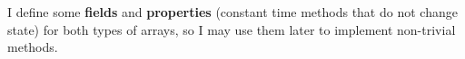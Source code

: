 I define some \textbf{fields} and \textbf{properties} (constant time methods that do not change state) for both types of arrays, so I may use them later to implement non-trivial methods.